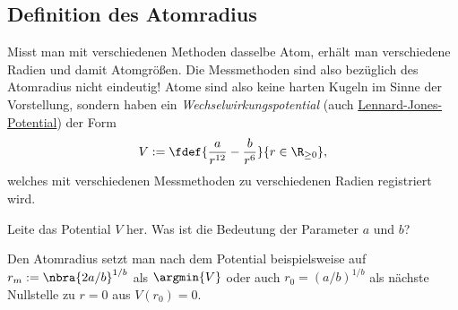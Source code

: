\documentclass{subfiles}
\begin{document}
        \subsection{Definition des Atomradius}
            Misst man mit verschiedenen Methoden dasselbe Atom, erhält man verschiedene Radien und damit Atomgrößen. Die Messmethoden sind also bezüglich des Atomradius nicht eindeutig! Atome sind also keine harten Kugeln im Sinne der Vorstellung, sondern haben ein \emph{Wechselwirkungspotential} (auch \href{https://de.wikipedia.org/wiki/Lennard-Jones-Potential}{Lennard-Jones-Potential}) der Form 
            \[V:=\fdef{\frac{a}{r^{12}}-\frac{b}{r^6}}{r\in\R_{\geq 0}},\]
            welches mit verschiedenen Messmethoden zu verschiedenen Radien registriert wird. 
            \begin{Aufgabe}
                \nr{} Leite das Potential $V$ her. Was ist die Bedeutung der Parameter $a$ und $b$?
            \end{Aufgabe}
            Den Atomradius setzt man nach dem Potential beispielsweise auf $r_m:=\nbra{2a/b}^{1/b}$ als $\argmin{V}$ oder auch $r_0=(a/b)^{1/b}$ als nächste Nullstelle zu $r=0$ aus $V(r_0)=0$. 
            
\end{document}
